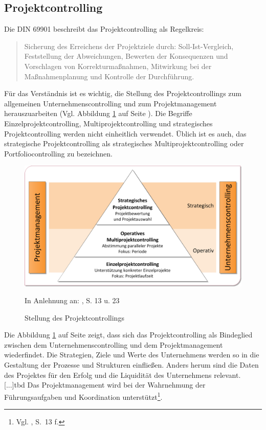 \subsection{Projektcontrolling}
\label{ssec:pc}
Die DIN 69901 beschreibt das Projektcontrolling als Regelkreis:\begin{quote}Sicherung des Erreichens der Projektziele durch: Soll-Ist-Vergleich, Feststellung der Abweichungen, Bewerten der Konsequenzen und Vorschlagen von Korrekturmaßnahmen, Mitwirkung bei der Maßnahmenplanung und Kontrolle der Durchführung.
\end{quote}
Für das Verständnis ist es wichtig, die Stellung des Projektcontrollings zum allgemeinen Unternehmenscontrolling und zum Projektmanagement herauszuarbeiten (Vgl. Abbildung \ref{abb3} auf Seite \pageref{abb3}). Die Begriffe Einzelprojektcontrolling, Multiprojektcontrolling und strategisches Projektcontrolling werden nicht einheitlich verwendet. Üblich ist es auch, das strategische Projektcontrolling als strategisches Multiprojektcontrolling oder Portfoliocontrolling zu bezeichnen.
\begin{figure}[htbp]
\includegraphics[width=1\textwidth]{Images/stellungProjektcontrolling.png} 
\begin{center}
   {\footnotesize In Anlehnung an: \cite{Fiedler2008}, S. 13 u. 23}
   \caption[Stellung des Projektcontrollings]{Stellung des Projektcontrollings}\label{abb3}
\end{center}
\end{figure}
Die Abbildung \ref{abb3} auf Seite \pageref{abb3} zeigt, dass sich das Projektcontrolling als Bindeglied zwischen dem Unternehmenscontrolling und dem Projektmanagement wiederfindet.
Die Strategien, Ziele und Werte des Unternehmens werden so in die Gestaltung der Prozesse und Strukturen einfließen. Anders herum sind die Daten des Projektes für den Erfolg und die Liquidität des Unternehmens relevant. [...]tbd
Das Projektmanagement wird bei der Wahrnehmung der Führungsaufgaben und Koordination unterstützt\footnote{Vgl. \cite{Fiedler2008}, S.~13 f.}.

